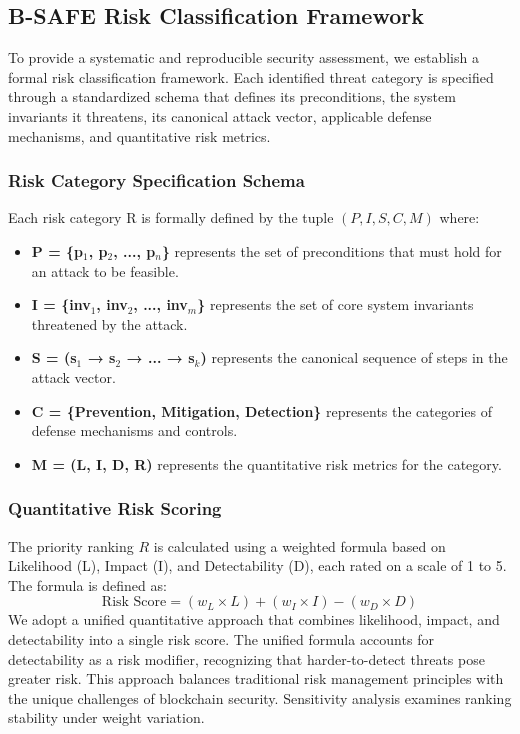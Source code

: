 \subsection{B-SAFE Risk Classification Framework}
\label{sec:methodology_risk_framework}
To provide a systematic and reproducible security assessment, we establish a formal risk classification framework. Each identified threat category is specified through a standardized schema that defines its preconditions, the system invariants it threatens, its canonical attack vector, applicable defense mechanisms, and quantitative risk metrics.

\subsubsection{Risk Category Specification Schema}
Each risk category R is formally defined by the tuple \( (P, I, S, C, M) \) where:
\begin{itemize}
    \item \textbf{P = \{p$_1$, p$_2$, ..., p$_n$\}} represents the set of preconditions that must hold for an attack to be feasible.
    \item \textbf{I = \{inv$_1$, inv$_2$, ..., inv$_m$\}} represents the set of core system invariants threatened by the attack.
    \item \textbf{S = (s$_1$ → s$_2$ → ... → s$_k$)} represents the canonical sequence of steps in the attack vector.
    \item \textbf{C = \{Prevention, Mitigation, Detection\}} represents the categories of defense mechanisms and controls.
    \item \textbf{M = (L, I, D, R)} represents the quantitative risk metrics for the category.
\end{itemize}

\subsubsection{Quantitative Risk Scoring}
The priority ranking \( R \) is calculated using a weighted formula based on Likelihood (L), Impact (I), and Detectability (D), each rated on a scale of 1 to 5. The formula is defined as:
\begin{equation}
    \text{Risk Score} = (w_L \times L) + (w_I \times I) - (w_D \times D)
\end{equation}
We adopt a unified quantitative approach that combines likelihood, impact, and detectability into a single risk score. The unified formula accounts for detectability as a risk modifier, recognizing that harder-to-detect threats pose greater risk. This approach balances traditional risk management principles with the unique challenges of blockchain security. Sensitivity analysis examines ranking stability under weight variation.

